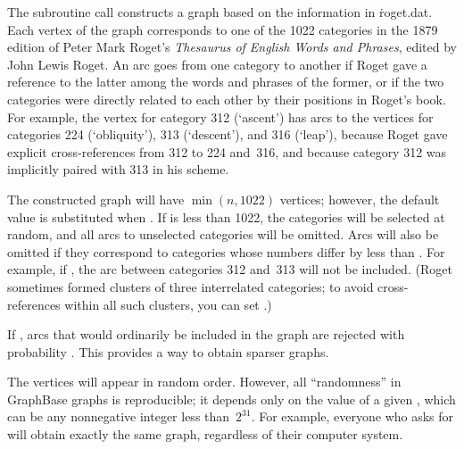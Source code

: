 The subroutine call 
constructs a graph based on the information in \.{roget.dat}.
Each vertex of the graph corresponds to one of the 1022 categories in
the 1879 edition of Peter Mark Roget's {\sl Thesaurus of English Words
and Phrases}, edited by John Lewis Roget.
An arc goes from one category to another if Roget gave a
reference to the latter among the words and phrases of the former,
or if the two categories were directly related to each other by their
positions in Roget's book. For example, the vertex for category 312
(`ascent') has arcs to the vertices for categories 224 (`obliquity'),
313 (`descent'), and 316 (`leap'), because Roget gave explicit
cross-references from 312 to 224 and~316, and because category 312
was implicitly paired with 313 in his scheme.

The constructed graph will have $\min(n,1022)$ vertices; however, the
default value  is substituted when . If %
 is less
than 1022, the  categories will be selected at random,
and all arcs to unselected categories will be omitted.
Arcs will also be omitted if they correspond to categories whose
numbers differ by less than . For example, if
, the arc between categories 312 and~313 will not
be included. (Roget sometimes formed clusters of three interrelated
categories; to avoid cross-references within all such clusters, you can set
.)

If , arcs that would ordinarily be included in the graph
are
rejected with probability . This provides a way
to obtain sparser graphs.

The vertices will appear in random order. However, all ``randomness''
in GraphBase graphs is reproducible; it depends only on the value of
a given , which can be any nonnegative integer less than~$2^{31}$.
For example, everyone who asks for  will
obtain exactly the same graph, regardless of their computer system.

